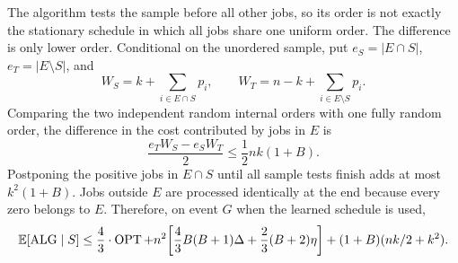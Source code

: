 The algorithm tests the sample before all other jobs, so its order is not
exactly the stationary schedule in which all jobs share one uniform order.
The difference is only lower order.  Conditional on the unordered sample,
put $e_S=|E\cap S|$, $e_T=|E\setminus S|$, and
\[
 W_S=k+\sum_{i\in E\cap S}p_i,\qquad
 W_T=n-k+\sum_{i\in E\setminus S}p_i.
\]
Comparing the two independent random internal orders with one fully random
order, the difference in the cost contributed by jobs in $E$ is
\[
 \frac{e_TW_S-e_SW_T}{2}
 \le\frac12nk(1+B).
\]
Postponing the positive jobs in $E\cap S$ until all sample tests finish adds
at most $k^2(1+B)$.  Jobs outside $E$ are processed identically at the end
because every zero belongs to $E$.  Therefore, on event $G$ when the learned
schedule is used,
\begin{equation}
 \mathbb{E}[\operatorname{ALG}\mid S]
 \le\frac43\cdot\operatorname{OPT}
 +n^2\!\left[\frac43B(B+1)\Delta+\frac23(B+2)\eta\right]
 +(1+B)(nk/2+k^2).
 \label{eq:rand-good-learned}
\end{equation}

